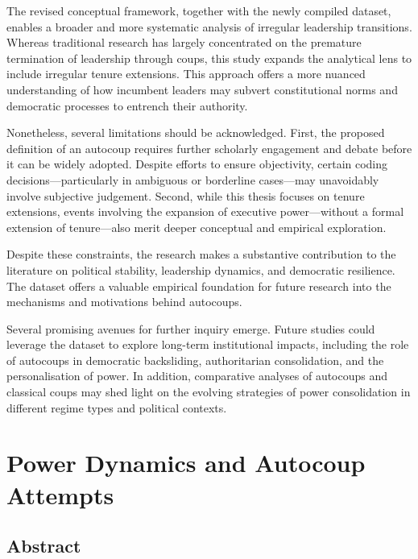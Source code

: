 \documentclass[
  12pt,
]{report}
\begin{document}
The revised conceptual framework, together with the newly compiled
dataset, enables a broader and more systematic analysis of irregular
leadership transitions. Whereas traditional research has largely
concentrated on the premature termination of leadership through coups,
this study expands the analytical lens to include irregular tenure
extensions. This approach offers a more nuanced understanding of how
incumbent leaders may subvert constitutional norms and democratic
processes to entrench their authority.

Nonetheless, several limitations should be acknowledged. First, the
proposed definition of an autocoup requires further scholarly engagement
and debate before it can be widely adopted. Despite efforts to ensure
objectivity, certain coding decisions---particularly in ambiguous or
borderline cases---may unavoidably involve subjective judgement. Second,
while this thesis focuses on tenure extensions, events involving the
expansion of executive power---without a formal extension of
tenure---also merit deeper conceptual and empirical exploration.

Despite these constraints, the research makes a substantive contribution
to the literature on political stability, leadership dynamics, and
democratic resilience. The dataset offers a valuable empirical
foundation for future research into the mechanisms and motivations
behind autocoups.

Several promising avenues for further inquiry emerge. Future studies
could leverage the dataset to explore long-term institutional impacts,
including the role of autocoups in democratic backsliding, authoritarian
consolidation, and the personalisation of power. In addition,
comparative analyses of autocoups and classical coups may shed light on
the evolving strategies of power consolidation in different regime types
and political contexts.

\chapter{Power Dynamics and Autocoup Attempts}\label{sec-chapter2}

\section*{Abstract}\label{abstract-2}
\end{document}
